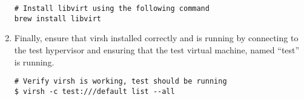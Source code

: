 \begin{enumerate}
\lstset{language=bash, caption=Install libvirt}
\begin{lstlisting}
# Install libvirt using the following command
brew install libvirt
\end{lstlisting}

\item 	Finally, ensure that virsh installed correctly and is running by connecting to the test hypervisor and ensuring 
		that the test virtual machine, named ``test'' is running.

\lstset{language=bash,caption=Verify virsh was Installed Properly}
\begin{lstlisting}
# Verify virsh is working, test should be running
$ virsh -c test:///default list --all
\end{lstlisting}
\end{enumerate}




